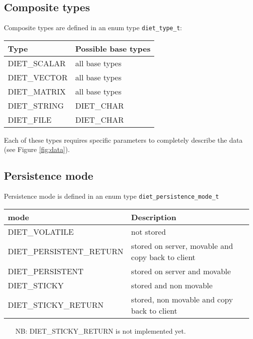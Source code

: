 \subsection{Composite types}
\label{ssec:complex}

Composite types are defined in an enum type \texttt{diet\_type\_t}:
\begin{center}
\footnotesize
\begin{tabular}{|l|l|}
\hline
\textbf{Type}&\textbf{Possible base types}\\
\hline
\textsf{DIET\_SCALAR} & all base types\\
\textsf{DIET\_VECTOR} & all base types\\
\textsf{DIET\_MATRIX} & all base types\\
\textsf{DIET\_STRING} & \textsf{DIET\_CHAR}\\
\textsf{DIET\_FILE}   & \textsf{DIET\_CHAR}\\
\hline
\end{tabular}
\end{center}

Each of these types requires specific parameters to completely describe the
data (see Figure \ref{fig:data}).


\subsection{Persistence mode}
\label{ssec:persismode}
Persistence mode is defined in an enum type \texttt{diet\_persistence\_mode\_t}

\begin{center}
\footnotesize
\begin{tabular}{|l|l|}
\hline
\textbf{mode}&\textbf{Description}\\
\hline
\textsf{DIET\_VOLATILE} & not stored\\
\textsf{DIET\_PERSISTENT\_RETURN} & stored on server, movable and copy back to client\\
\textsf{DIET\_PERSISTENT} & stored on server and movable\\
\textsf{DIET\_STICKY} & stored and non movable\\
\hline\hline
\textsf{DIET\_STICKY\_RETURN} & stored, non movable and copy back to client\\
\hline
\end{tabular}
\end{center}

\begin{itemize}
\item[NB:] \textsf{DIET\_STICKY\_RETURN} is not implemented yet.
\end{itemize}

